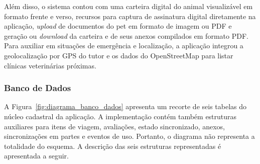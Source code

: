 \documentclass{UNESC}
\begin{document}
Além disso, o sistema contou com uma carteira digital do animal visualizável em formato frente e verso, recursos para captura de assinatura digital diretamente na aplicação, \textit{upload} de documentos do pet em formato de imagem ou PDF e geração ou \textit{download} da carteira e de seus anexos compilados em formato PDF. Para auxiliar em situações de emergência e localização, a aplicação integrou a geolocalização por GPS do tutor e os dados do OpenStreetMap para listar clínicas veterinárias próximas.

\subsubsection{Banco de Dados}

A Figura~\ref{fig:diagrama_banco_dados} apresenta um recorte de seis tabelas do núcleo cadastral da aplicação. A implementação contém também estruturas auxiliares para itens de viagem, avaliações, estado sincronizado, anexos, sincronizações em partes e eventos de uso. Portanto, o diagrama não representa a totalidade do esquema. A descrição das seis estruturas representadas é apresentada a seguir.
\end{document}
